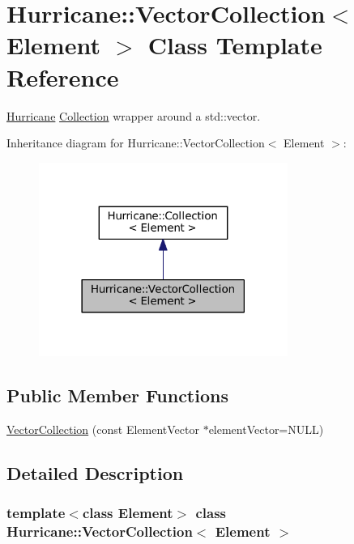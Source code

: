 \hypertarget{classHurricane_1_1VectorCollection}{}\section{Hurricane\+:\+:Vector\+Collection$<$ Element $>$ Class Template Reference}
\label{classHurricane_1_1VectorCollection}


\mbox{\hyperlink{namespaceHurricane}{Hurricane}} \mbox{\hyperlink{classHurricane_1_1Collection}{Collection}} wrapper around a std\+::vector.  




Inheritance diagram for Hurricane\+:\+:Vector\+Collection$<$ Element $>$\+:\nopagebreak
\begin{figure}[H]
\begin{center}
\leavevmode
\includegraphics[width=230pt]{classHurricane_1_1VectorCollection__inherit__graph}
\end{center}
\end{figure}
\subsection*{Public Member Functions}
\begin{DoxyCompactItemize}
\item 
\mbox{\hyperlink{classHurricane_1_1VectorCollection_a783d1c053ef4d46040db27bba255dfb8}{Vector\+Collection}} (const Element\+Vector $\ast$element\+Vector=N\+U\+LL)
\end{DoxyCompactItemize}


\subsection{Detailed Description}
\subsubsection*{template$<$class Element$>$\newline
class Hurricane\+::\+Vector\+Collection$<$ Element $>$}

